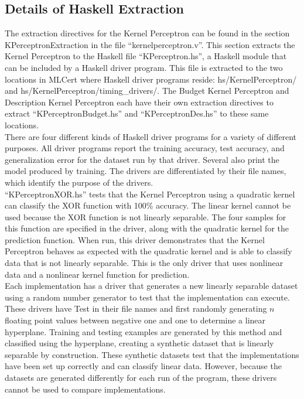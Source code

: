 \subsection{Details of Haskell Extraction}\label{DetailsHaskellExtraction}
The extraction directives for the Kernel Perceptron can be found in the section KPerceptronExtraction in the file ``kernelperceptron.v''. This section extracts the Kernel Perceptron to the Haskell file ``KPerceptron.hs'', a Haskell module that can be included by a Haskell driver program. This file is extracted to the two locations in MLCert where Haskell driver programs reside: hs/KernelPerceptron/ and hs/KernelPerceptron/timing\_drivers/. The Budget Kernel Perceptron and Description Kernel Perceptron each have their own extraction directives to extract ``KPerceptronBudget.hs'' and ``KPerceptronDes.hs'' to these same locations. 
\\There are four different kinds of Haskell driver programs for a variety of different purposes. All driver programs report the training accuracy, test accuracy, and generalization error for the dataset run by that driver. Several also print the model produced by training. The drivers are differentiated by their file names, which identify the purpose of the drivers.
\\``KPerceptronXOR.hs'' tests that the Kernel Perceptron using a quadratic kernel can classify the XOR function with 100\% accuracy. The linear kernel cannot be used because the XOR function is not linearly separable. The four samples for this function are specified in the driver, along with the quadratic kernel for the prediction function. When run, this driver demonstrates that the Kernel Perceptron behaves as expected with the quadratic kernel and is able to classify data that is not linearly separable. This is the only driver that uses nonlinear data and a nonlinear kernel function for prediction.
\\Each implementation has a driver that generates a new linearly separable dataset using a random number generator to test that the implementation can execute. These drivers have Test in their file names and first randomly generating $n$ floating point values between negative one and one to determine a linear hyperplane. Training and testing examples are generated by this method and classified using the hyperplane, creating a synthetic dataset that is linearly separable by construction. These synthetic datasets test that the implementations have been set up correctly and can classify linear data. However, because the datasets are generated differently for each run of the program, these drivers cannot be used to compare implementations.
